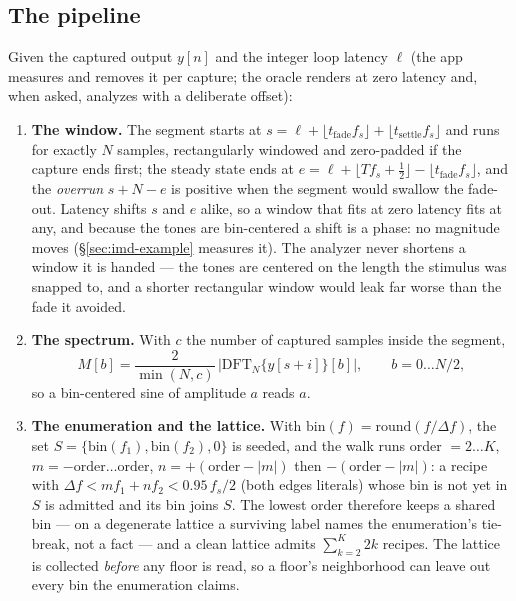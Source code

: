 \documentclass[11pt,a4paper]{article}
\begin{document}
\subsection{The pipeline}
\label{sec:imd-pipeline}
Given the captured output $y[n]$ and the integer loop latency $\ell$ (the
app measures and removes it per capture; the oracle renders at zero
latency and, when asked, analyzes with a deliberate offset):

{\sloppy
\begin{enumerate}
\item \textbf{The window.} The segment starts at
$s = \ell + \lfloor t_{\mathrm{fade}} f_s\rfloor + \lfloor t_{\mathrm{settle}} f_s\rfloor$
and runs for exactly $N$ samples, rectangularly windowed and zero-padded
if the capture ends first; the steady state ends at
$e = \ell + \lfloor T f_s + \tfrac12\rfloor - \lfloor t_{\mathrm{fade}} f_s\rfloor$,
and the \emph{overrun} $s + N - e$ is positive when the segment would
swallow the fade-out. Latency shifts $s$ and $e$ alike, so a window that
fits at zero latency fits at any, and because the tones are bin-centered a
shift is a phase: no magnitude moves (\S\ref{sec:imd-example} measures
it). The analyzer never shortens a window it is handed --- the tones are
centered on the length the stimulus was snapped to, and a shorter
rectangular window would leak far worse than the fade it avoided.

\item \textbf{The spectrum.} With $c$ the number of captured samples inside
the segment,
\begin{equation}
  M[b] = \frac{2}{\min(N, c)}\,\Big|\mathrm{DFT}_N\{y[s + i]\}[b]\Big|,\qquad b = 0 \ldots N/2,
  \label{eq:imdmag}
\end{equation}
so a bin-centered sine of amplitude $a$ reads $a$.

\item \textbf{The enumeration and the lattice.} With $\mathrm{bin}(f) =
\mathrm{round}(f/\Delta f)$, the set $S = \{\mathrm{bin}(f_1), \mathrm{bin}(f_2), 0\}$
is seeded, and the walk runs order $= 2 \ldots K$, $m = -\mathrm{order}
\ldots \mathrm{order}$, $n = +(\mathrm{order} - |m|)$ then
$-(\mathrm{order} - |m|)$: a recipe with $\Delta f < m f_1 + n f_2 <
0.95\,f_s/2$ (both edges literals) whose bin is not yet in $S$ is admitted
and its bin joins $S$. The lowest order therefore keeps a shared bin --- on
a degenerate lattice a surviving label names the enumeration's tie-break,
not a fact --- and a clean lattice admits $\sum_{k=2}^{K} 2k$ recipes. The
lattice is collected \emph{before} any floor is read, so a floor's
neighborhood can leave out every bin the enumeration claims.


\end{enumerate}}
\end{document}
